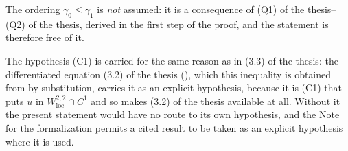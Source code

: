 \begin{helper}[Inequality (3.4)]
The ordering $\gamma_0\le\gamma_1$ is \emph{not} assumed: it is a consequence of
(Q1) of the thesis--(Q2) of the thesis, derived in the first step of the proof, and the
statement is therefore free of it.

The hypothesis (C1) is carried for the same reason as in (3.3) of the thesis: the differentiated equation
(3.2) of the thesis (), which this inequality is
obtained from by substitution, carries it as an explicit hypothesis, because it
is (C1) that puts $u$ in $W^{2,2}_{\mathrm{loc}}\cap C^1$ and so makes
(3.2) of the thesis available at all.  Without it the present statement would have no
route to its own hypothesis, and the Note for the formalization permits a cited
result to be taken as an explicit hypothesis where it is used.
\end{helper}
